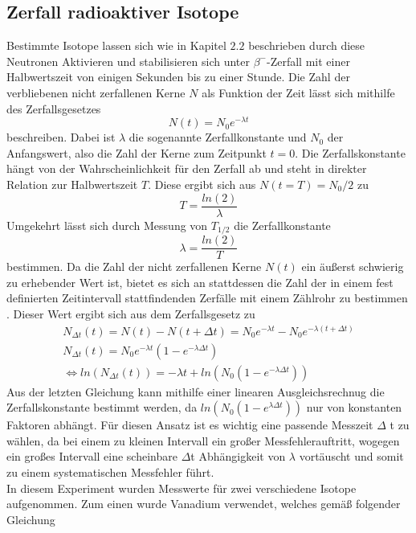 \documentclass{scrartcl}
\begin{document}
\subsection{Zerfall radioaktiver Isotope}
Bestimmte Isotope lassen sich wie in Kapitel $2.2$ beschrieben durch diese Neutronen Aktivieren und stabilisieren sich unter $\beta^-$-Zerfall mit einer Halbwertszeit von einigen Sekunden bis zu einer Stunde. Die Zahl der verbliebenen nicht zerfallenen Kerne $N$ als Funktion der Zeit lässt sich mithilfe des Zerfallsgesetzes
\begin{equation}
N(t)=N_0e^{-\lambda t}
\end{equation}
beschreiben. Dabei ist $\lambda$ die sogenannte Zerfallkonstante und $N_0$ der Anfangswert, also die Zahl der Kerne zum Zeitpunkt $t=0$. Die Zerfallskonstante hängt von der Wahrscheinlichkeit für den Zerfall ab und steht in direkter Relation zur Halbwertszeit $T$. Diese ergibt sich aus $N(t=T)=N_0/2$ zu
\begin{equation}
T=\frac{ln(2)}{\lambda}
\end{equation}
Umgekehrt lässt sich durch Messung von $T_{1/2}$ die Zerfallkonstante
\begin{equation*}
\lambda=\frac{ln(2)}{T}
\end{equation*}
bestimmen. Da die Zahl der nicht zerfallenen Kerne $N(t)$ ein äußerst schwierig zu erhebender Wert ist, bietet es sich an  stattdessen die Zahl der in einem fest definierten Zeitintervall stattfindenden Zerfälle mit einem Zählrohr zu bestimmen . Dieser Wert ergibt sich aus dem Zerfallsgesetz zu
\begin{gather}
N_{\Delta t}(t)=N(t)-N(t + \Delta t)=N_0e^{-\lambda t}-N_0e^{-\lambda (t+\Delta t)} \\
N_{\Delta t}(t)=N_0e^{-\lambda t}(1-e^{-\lambda \Delta t} ) \\
\iff ln(N_{\Delta t}(t))=-\lambda t + ln(N_0(1-e^{-\lambda \Delta t}))
\end{gather}
Aus der letzten Gleichung kann mithilfe einer linearen Ausgleichsrechnug die Zerfallskonstante bestimmt werden, da $ln(N_0(1-e^{\lambda \Delta t}))$ nur von konstanten Faktoren abhängt. Für diesen Ansatz ist es wichtig eine passende Messzeit $\Delta$ t zu wählen, da bei einem zu kleinen Intervall ein großer Messfehlerauftritt, wogegen ein großes Intervall eine scheinbare $\Delta$t Abhängigkeit von $\lambda$ vortäuscht und somit zu einem systematischen Messfehler führt. \\
In diesem Experiment wurden Messwerte für zwei verschiedene Isotope aufgenommen. Zum einen wurde Vanadium verwendet, welches gemäß folgender Gleichung
\end{document}
